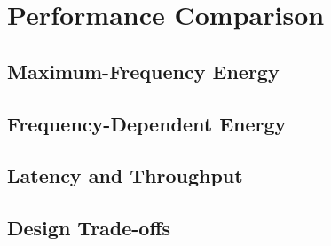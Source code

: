 \documentclass[a4paper,11pt]{article}
\begin{document}
\section{Performance Comparison}

\subsection{Maximum-Frequency Energy}




\subsection{Frequency-Dependent Energy}


\subsection{Latency and Throughput}


\subsection{Design Trade-offs}
\end{document}
